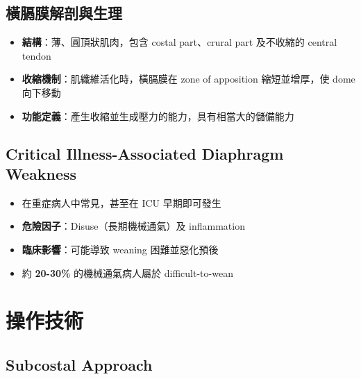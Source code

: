 \documentclass[12pt,a4paper]{article}
\begin{document}
\subsection{橫膈膜解剖與生理}

\begin{itemize}
    \item \textbf{結構}：薄、圓頂狀肌肉，包含 costal part、crural part 及不收縮的 central tendon
    \item \textbf{收縮機制}：肌纖維活化時，橫膈膜在 zone of apposition 縮短並增厚，使 dome 向下移動
    \item \textbf{功能定義}：產生收縮並生成壓力的能力，具有相當大的儲備能力
\end{itemize}

\subsection{Critical Illness-Associated Diaphragm Weakness}

\begin{itemize}
    \item 在重症病人中常見，甚至在 ICU 早期即可發生
    \item \textbf{危險因子}：Disuse（長期機械通氣）及 inflammation
    \item \textbf{臨床影響}：可能導致 weaning 困難並惡化預後
    \item 約 \textbf{20-30\%} 的機械通氣病人屬於 difficult-to-wean
\end{itemize}

\section{操作技術}


\subsection{Subcostal Approach}
\end{document}
